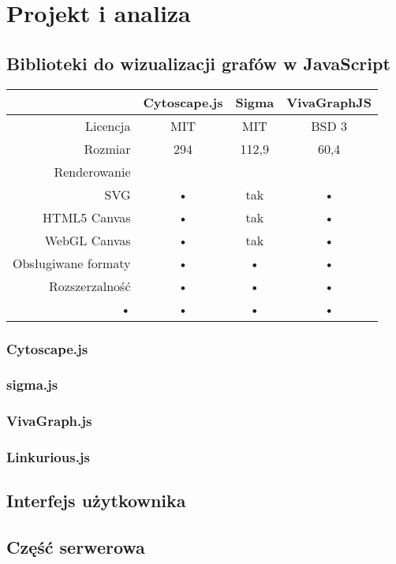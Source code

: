 \chapter{Projekt i analiza}
\section{Biblioteki do wizualizacji grafów w JavaScript}

\begin{tabu}{|r|c|c|c}
\hline 
\rowfont{\bfseries}
 & Cytoscape.js & Sigma & VivaGraphJS \\ 
\hline 
Licencja & MIT & MIT & BSD 3 \\ 
\hline 
Rozmiar & 294 & 112,9 & 60,4 \\ 
\hline 
Renderowanie & & & \\
SVG & • & tak & • \\
HTML5 Canvas & • & tak & • \\
WebGL Canvas & • & tak & • \\ 
\hline 
Obsługiwane formaty & • & • & • \\ 
\hline
Rozszerzalność & • & • & • \\ 
\hline 
• & • & • & • \\ 
\hline 
\end{tabu} 
\subsection{Cytoscape.js}
\subsection{sigma.js}
\subsection{VivaGraph.js}
\subsection{Linkurious.js}

\section{Interfejs użytkownika}
\section{Część serwerowa}